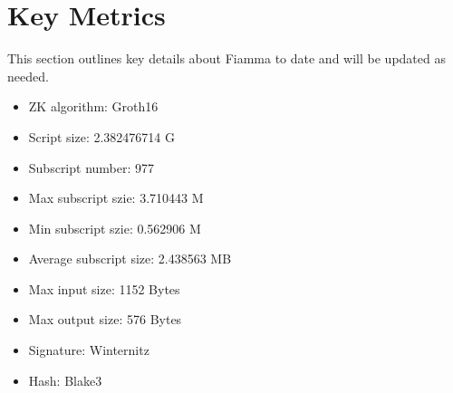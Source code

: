 \section{Key Metrics} \label{sec:Key Metrics}
This section outlines key details about Fiamma to date and will be updated as needed.

\begin{itemize}
\item ZK algorithm: Groth16 \cite{website:Groth16}
\item Script size: 2.382476714 G
\item Subscript number: 977
\item Max subscript szie: 3.710443 M 
\item Min subscript szie: 0.562906 M 
\item Average subscript size: 2.438563 MB
\item Max input size: 1152 Bytes
\item Max output size: 576 Bytes
\item Signature: Winternitz
\item Hash: Blake3
\end{itemize}
